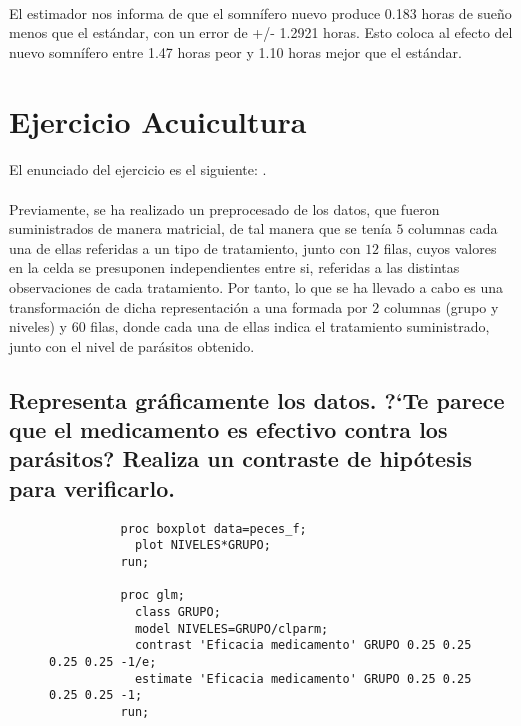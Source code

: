 \documentclass{article}
\begin{document}
    \paragraph{}
    El estimador nos informa de que el somnífero nuevo produce 0.183 horas de sueño menos que el estándar, con un error de +/- 1.2921 horas. Esto coloca al efecto del nuevo somnífero entre 1.47 horas peor y 1.10 horas mejor que el estándar.

  \section{Ejercicio Acuicultura}

    \paragraph{}
    El enunciado del ejercicio es el siguiente: .

    \paragraph{}
    Previamente, se ha realizado un preprocesado de los datos, que fueron suministrados de manera matricial, de tal manera que se tenía $5$ columnas cada una de ellas referidas a un tipo de tratamiento, junto con $12$ filas, cuyos valores en la celda se presuponen independientes entre si, referidas a las distintas observaciones de cada tratamiento. Por tanto, lo que se ha llevado a cabo es una transformación de dicha representación a una formada por $2$ columnas (grupo y niveles) y $60$ filas, donde cada una de ellas indica el tratamiento suministrado, junto con el nivel de parásitos obtenido.

    \subsection{Representa gráficamente los datos. ?`Te parece que el medicamento es efectivo contra los parásitos? Realiza un contraste de hipótesis para verificarlo.}

      \begin{figure}[h]
        \centering
        \begin{verbatim}
          proc boxplot data=peces_f;
            plot NIVELES*GRUPO;
          run;

          proc glm;
            class GRUPO;
            model NIVELES=GRUPO/clparm;
            contrast 'Eficacia medicamento' GRUPO 0.25 0.25 0.25 0.25 -1/e;
            estimate 'Eficacia medicamento' GRUPO 0.25 0.25 0.25 0.25 -1;
          run;
        \end{verbatim}
        \caption{}
        \label{code:sas_3}
      \end{figure}
\end{document}
